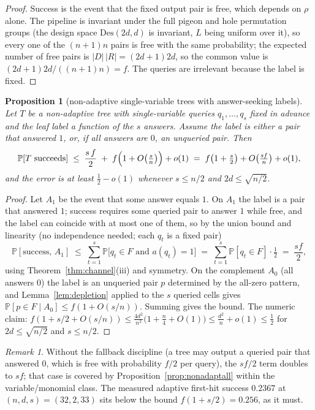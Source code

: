 \documentclass[11pt]{article}
\newtheorem{proposition}[theorem]{Proposition}
\theoremstyle{definition}
\theoremstyle{remark}
\newtheorem{remark}[theorem]{Remark}
\newcommand{\Des}{\mathrm{Des}}
\newcommand{\Prob}{\mathbb{P}}
\begin{document}
\begin{proof}
Success is the event that the fixed output pair is free, which depends
on $\rho$ alone.  The pipeline is invariant under the full pigeon and
hole permutation groups (the design space $\Des(2d,d)$ is invariant, $L$
being uniform over it), so every one of the $(n+1)n$ pairs is free with
the same probability; the expected number of free pairs is
$|D|\,|R|=(2d+1)2d$, so the common value is
$(2d+1)2d/((n+1)n)=f$.  The queries are irrelevant because the label is
fixed.
\end{proof}

\begin{proposition}[non-adaptive single-variable trees with answer-seeking
labels]\label{prop:nonadaptsingle}
Let $T$ be a non-adaptive tree with single-variable queries
$q_1,\dots,q_s$ fixed in advance and the leaf label a function of the
$s$ answers.  Assume the label is either a pair that answered $1$, or,
if all answers are $0$, an unqueried pair.  Then
\[
\Prob[T\text{ succeeds}]
\;\le\;\frac{s\,f}{2}\;+\;f\Bigl(1+O\bigl(\tfrac{s}{n}\bigr)\Bigr)+o(1)
\;=\;f\bigl(1+\tfrac{s}{2}\bigr)+O\bigl(\tfrac{sf}{n}\bigr)+o(1),
\]
and the error is at least $\frac12-o(1)$ whenever $s\le n/2$ and
$2d\le\sqrt{n/2}$.
\end{proposition}

\begin{proof}
Let $A_1$ be the event that some answer equals $1$.  On $A_1$ the label
is a pair that answered $1$; success requires some queried pair to
answer $1$ while free, and the label can coincide with at most one of
them, so by the union bound and linearity (no independence needed; each
$q_t$ is a fixed pair)
\[
\Prob[\text{success},\,A_1]
\;\le\;\sum_{t=1}^{s}\Prob\bigl[q_t\in F \text{ and } a(q_t)=1\bigr]
\;=\;\sum_{t=1}^{s}\Prob[q_t\in F]\cdot\tfrac12
\;=\;\frac{sf}{2},
\]
using Theorem~\ref{thm:channel}(iii) and symmetry.  On the complement
$A_0$ (all answers $0$) the label is an unqueried pair $p$ determined by
the all-zero pattern, and Lemma~\ref{lem:depletion} applied to the $s$
queried cells gives
$\Prob[p\in F\mid A_0]\le f(1+O(s/n))$.  Summing gives the bound.  The
numeric claim: $f(1+s/2+O(s/n))\le \frac{4d^2}{n^2}\bigl(1+\frac{n}{4}
+O(1)\bigr)\le\frac{d^2}{n}+o(1)\le\frac12$ for $2d\le\sqrt{n/2}$ and
$s\le n/2$.
\end{proof}

\begin{remark}
Without the fallback discipline (a tree may output a queried pair that
answered $0$, which is free with probability $f/2$ per query), the
$s f/2$ term doubles to $s f$; that case is covered by
Proposition~\ref{prop:nonadaptall} within the variable/monomial class.
The measured adaptive first-hit
success $0.2367$ at $(n,d,s)=(32,2,33)$ sits below the bound
$f(1+s/2)=0.256$, as it must.
\end{remark}
\end{document}
